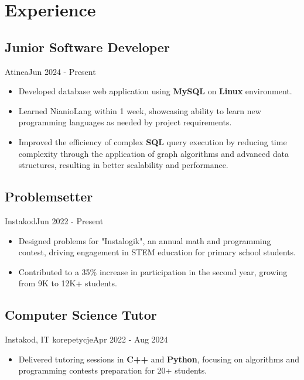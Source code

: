 \section{Experience}
\subsection{Junior Software Developer}{Atinea}{Jun 2024 - Present}
\begin{itemize}
    \item Developed database web application using \textbf{MySQL} on \textbf{Linux} environment.
    \item Learned NianioLang within 1 week, showcasing ability to learn new programming languages as needed by project requirements.
    \item Improved the efficiency of complex \textbf{SQL} query execution by reducing time complexity through the application of graph algorithms and
advanced data structures, resulting in better scalability and performance.
\end{itemize}

\subsection{Problemsetter}{Instakod}{Jun 2022 - Present}
\begin{itemize}
    \item Designed problems for "Instalogik", an annual math and programming contest, driving engagement in STEM education for primary school students.
    \item Contributed to a 35\% increase in participation in the second year, growing from 9K to 12K+ students.
\end{itemize}

\subsection{Computer Science Tutor}{Instakod, IT korepetycje}{Apr 2022 - Aug 2024}
\begin{itemize}
    \item Delivered tutoring sessions in \textbf{C++} and \textbf{Python}, focusing on algorithms and programming contests preparation for 20+ students.
\end{itemize}

\vspace{1em}
